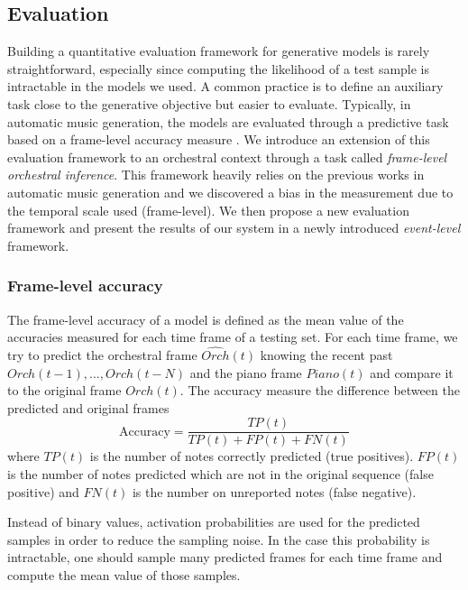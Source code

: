 \documentclass[letterpaper]{article}
\begin{document}
\subsection{Evaluation}
Building a quantitative evaluation framework for generative models is rarely straightforward, especially since computing the likelihood of a test sample is intractable in the models we used. A common practice is to define an auxiliary task close to the generative objective but easier to evaluate.
Typically, in automatic music generation, the models are evaluated through a predictive task based on a frame-level accuracy measure \cite{DBLP:journals/corr/LiuR14a,boulanger2012modeling,lavrenko2003polyphonic}. We introduce an extension of this evaluation framework to an orchestral context through a task called \textit{frame-level orchestral inference}. This framework heavily relies on the previous works in automatic music generation and we discovered a bias in the measurement due to the temporal scale used (frame-level). We then propose a new evaluation framework and present the results of our system in a newly introduced \textit{event-level} framework.

\subsubsection{Frame-level accuracy}
The frame-level accuracy of a model is defined as the mean value of the accuracies measured for each time frame of a testing set.
For each time frame, we try to predict the orchestral frame $\hat{Orch}(t)$ knowing the recent past $Orch(t-1),...,Orch(t-N)$ and the piano frame $Piano(t)$ and compare it to the original frame $Orch(t)$. The accuracy measure the difference between the predicted and original frames \cite{boulanger2012modeling,DBLP:journals/corr/LiuR14a}
\begin{equation}
\text{Accuracy}  = \frac{TP(t)}{TP(t) + FP(t) + FN(t)}
\label{eq:accuracy}
\end{equation}
where $TP(t)$ is the number of notes correctly predicted (true positives). $FP(t)$ is the number of notes predicted which are not in the original sequence (false positive) and $FN(t)$ is the number on unreported notes (false negative). 

Instead of binary values, activation probabilities are used for the predicted samples in order to reduce the sampling noise. In the case this probability is intractable, one should sample many predicted frames for each time frame and compute the mean value of those samples.
\end{document}

